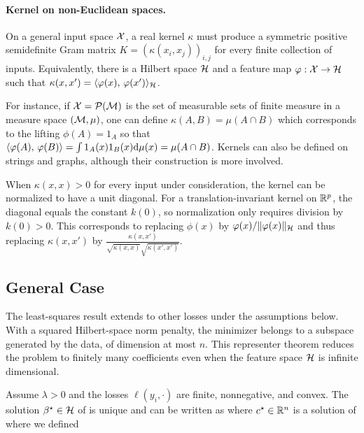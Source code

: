 \paragraph{Kernel on non-Euclidean spaces.}

On a general input space $\mathcal{X}$, a real kernel $\kappa$ must produce a symmetric positive semidefinite Gram matrix $K=(\kappa(x_i,x_j))_{i,j}$ for every finite collection of inputs. Equivalently, there is a Hilbert space $\mathcal{H}$ and a feature map $\varphi:\mathcal{X} \rightarrow \mathcal{H}$ such that $\kappa(x,x')=\langle \varphi(x),\,\varphi(x')\rangle_{\mathcal{H}}$.

For instance, if $\mathcal{X} = \mathcal{P}(\mathcal{M})$ is the set of measurable sets of finite measure in a measure space $(\mathcal{M},\mu)$, one can define $\kappa(A,B) = \mu(A \cap B)$ which corresponds to the lifting $\phi(A)=1_A$ so that $\langle \varphi(A),\,\varphi(B)\rangle = \int 1_A(x) 1_B(x)\mathrm{d} \mu(x) = \mu(A \cap B)$.
%
Kernels can also be defined on strings and graphs, although their construction is more involved.

When $\kappa(x,x)>0$ for every input under consideration, the kernel can be normalized to have a unit diagonal. For a translation-invariant kernel on $\mathbb{R}^p$, the diagonal equals the constant $k(0)$, so normalization only requires division by $k(0)>0$. This corresponds to replacing $\phi(x)$ by $\varphi(x)/\lVert\varphi(x)\rVert_{\mathcal{H}}$ and thus replacing $\kappa(x,x')$ by $\frac{\kappa(x,x')}{\sqrt{\kappa(x,x)}\sqrt{\kappa(x',x')}}$.



\subsection{General Case}

The least-squares result extends to other losses under the assumptions below. With a squared Hilbert-space norm penalty, the minimizer belongs to a subspace generated by the data, of dimension at most $n$. This representer theorem reduces the problem to finitely many coefficients even when the feature space $\mathcal{H}$ is infinite dimensional.

\begin{prop}
	Assume $\lambda>0$ and the losses $\ell(y_i,\cdot)$ are finite, nonnegative, and convex. The solution $\beta^\star\in\mathcal{H}$ of
	is unique and can be written as
	where $c^\star\in\mathbb{R}^n$ is a solution of
	where we defined 
\end{prop}

